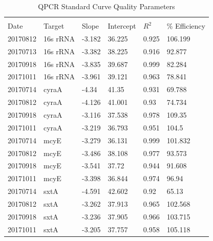 
\setcounter{table}{0}
\renewcommand{\thetable}{\Alph{chapter}\arabic{table}}
 \label{ch:extra}

\begin{table}[]
	\caption{QPCR Standard Curve Quality Parameters}
	\label{tab:qpcr}
	\begin{center}
\begin{tabular}{llllll} 
	\hline \\
	
Date     & Target   & Slope  & Intercept & $R^2$ & \% Efficiency \\ \hline
20170812 & 16s rRNA & -3.182 & 36.225    & 0.925 & 106.199        \\
20170713 & 16s rRNA & -3.382 & 38.225    & 0.916 & 92.877         \\
20170918 & 16s rRNA & -3.835 & 39.687    & 0.999 & 82.284         \\
20171011 & 16s rRNA & -3.961 & 39.121    & 0.963 & 78.841         \\
20170714 & cyraA    & -4.34  & 41.35     & 0.931 & 69.788         \\
20170812 & cyraA    & -4.126 & 41.001    & 0.93  & 74.734         \\
20170918 & cyraA    & -3.116 & 37.538    & 0.978 & 109.35         \\
20171011 & cyraA    & -3.219 & 36.793    & 0.951 & 104.5          \\
20170714 & mcyE     & -3.279 & 36.131    & 0.999 & 101.832        \\
20170812 & mcyE     & -3.486 & 38.108    & 0.977 & 93.573         \\
20170918 & mcyE     & -3.541 & 37.72     & 0.944 & 91.608         \\
20171011 & mcyE     & -3.398 & 36.844    & 0.974 & 96.94          \\
20170714 & sxtA     & -4.591 & 42.602    & 0.92  & 65.13          \\
20170812 & sxtA     & -3.262 & 37.913    & 0.965 & 102.568        \\
20170918 & sxtA     & -3.236 & 37.905    & 0.966 & 103.715        \\
20171011 & sxtA     & -3.205 & 37.757    & 0.958 & 105.118   \\ \hline
\end{tabular}
\end{center}
\end{table}

